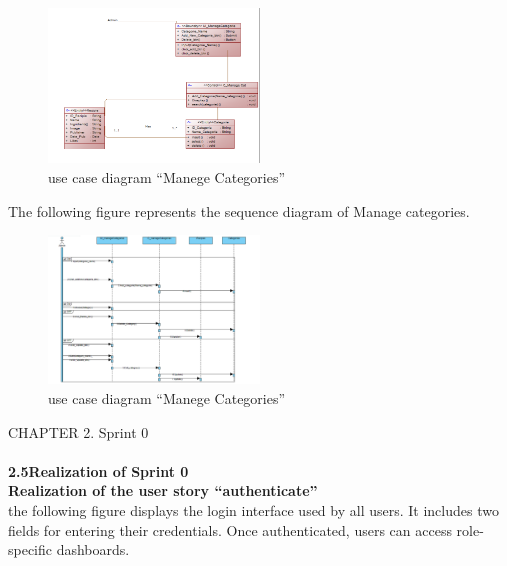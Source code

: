 \documentclass{article}
\begin{document}
{{{\begin{figure}[htbp]
    \centering
    \includegraphics[width=0.5\textwidth]{DiagManegeCat}
    \caption{use case diagram “Manege Categories”}
    \label{fig:design2}
\end{figure}
The following figure represents the sequence diagram of Manage categories.\\
\begin{figure}[htbp]
    \centering
    \includegraphics[width=0.5\textwidth]{mandia}
    \caption{use case diagram “Manege Categories”}
    \label{fig:design2}
\end{figure}
\newpage
\noindent
CHAPTER 2.  Sprint 0 \\
\underline{\hspace{\textwidth}} \vspace{0.2cm}\\
 {\Large \textbf{2.5\hspace{1em}Realization of Sprint 0}}\vspace{0.2cm}\\

\textbf{Realization of the user story “authenticate”}\\
the following figure displays the login interface used by all users. It includes two fields for entering their credentials. Once authenticated, users can access role-specific dashboards.\\

}}}
\end{document}

